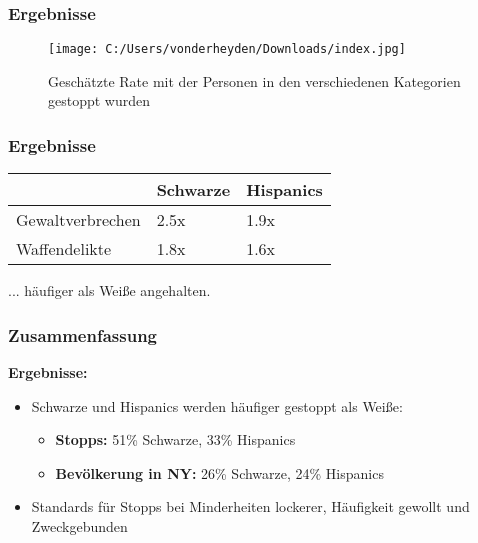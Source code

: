 \documentclass{beamer}
\begin{document}
	\begin{frame}
		\frametitle{Ergebnisse}
		\begin{figure}[h]
			\centering
			\texttt{[image: C:/Users/vonderheyden/Downloads/index.jpg]}
			\caption{Geschätzte Rate mit der Personen in den verschiedenen Kategorien gestoppt wurden}
			\label{fig:Ergebnisse}
		\end{figure}
	\end{frame}
	\begin{frame}
		\frametitle{Ergebnisse}
		\begin{table}
			\begin{tabular}{|l|l|l|}
				\hline
				& Schwarze & Hispanics \\
				\hline
				Gewaltverbrechen & 2.5x & 1.9x \\
				\hline
				Waffendelikte & 1.8x & 1.6x \\
				\hline
			\end{tabular}
		\end{table}
		\centering... häufiger als Weiße angehalten. \\
	\end{frame}
	\begin{frame}
		\frametitle{Zusammenfassung}
		\textbf{Ergebnisse:}
		\begin{itemize}
			\item[\textbullet] Schwarze und Hispanics werden häufiger gestoppt als Weiße:
			\begin{itemize}
				\item[\textbullet] \textbf{Stopps:} 51\% Schwarze, 33\% Hispanics 
				\item[\textbullet] \textbf{Bevölkerung in NY:} 26\% Schwarze, 24\% Hispanics
			\end{itemize}
			\item[\textbullet] Standards für Stopps bei Minderheiten lockerer, Häufigkeit gewollt und Zweckgebunden
		\end{itemize} 
	\end{frame}
\end{document}
